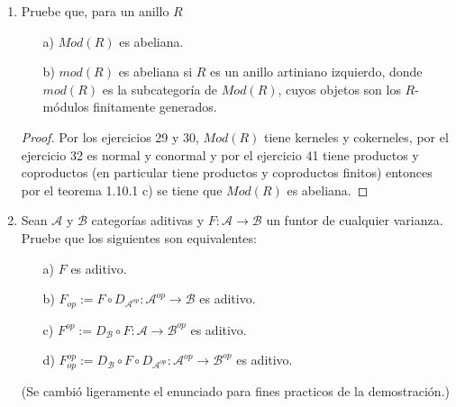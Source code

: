 \documentclass{article}
\begin{document}
\begin{enumerate}[label=\textbf{Ej \arabic*.}]
\begin{proof}
			 Sean $\lrbrack{\pi_1,\pi_2}$ las proyecciones naturales y $\lrbrack{\mu_1,\mu_2}$ las inclusiones naturales del biproducto $A\coprod C$. Entonces $\lambda=\alpha\pi_1+\beta\pi_2\in\ringmodhom{\mathscr{C}}{A\coprod C}{B}$. Supongamos que $f,g\in\ringmodhom{\mathscr{C}}{B}{D}$ son tales que $f\lambda=g\lambda$. Así
			\begin{align*}
				f\lrprth{\alpha\pi_1+\beta\pi_2}&=g\lrprth{\alpha\pi_1+\beta\pi_2},\\
				\implies f\lrprth{\alpha\pi_1+\beta\pi_2}\mu_1&=f\lrprth{\alpha\pi_1+\beta\pi_2}\mu_1\\
				\implies f\lrprth{\alpha\lrprth{\pi_1\mu_1}+\beta\lrprth{\pi_2\mu_1}}&=g\lrprth{\alpha\lrprth{\pi_1\mu_1}+\beta\lrprth{\pi_2\mu_1}}\\
				\implies f\lrprth{\alpha\lrprth{1_A}+\beta 0}&=g\lrprth{\alpha 1_A+\beta 0}\\
				\implies f\alpha=g\alpha.
			\end{align*}
			De lo anterior se sigue que $f=g$ si $\alpha$ es epi. La prueba es análoga, componiendo por $\mu_2$ a derecha, si suponemos que $\beta$ es epi.\\
		\end{proof}
		\item Pruebe que, para un anillo $R$
		\begin{itemize}
			\item[a)] $Mod(R)$ es abeliana.
			\item[b)] $mod(R)$ es abeliana si $R$ es un anillo artiniano izquierdo, donde $mod(R)$ es la subcategoría de $Mod(R)$, cuyos objetos son los $R$-módulos
			finitamente generados.
		\end{itemize}
		\begin{proof}
			 Por los ejercicios 29 y 30, $Mod(R)$ tiene kerneles y cokerneles, por el ejercicio 32 es normal y conormal y por el ejercicio 41 
			tiene productos y coproductos (en particular tiene productos y coproductos finitos) entonces por el teorema 1.10.1 c) se tiene que $Mod(R)$ es abeliana.	
		\end{proof}		
		\item Sean $\mathscr{A}$ y $\mathscr{B}$ categorías aditivas y $F:\mathscr{A}\to \mathscr{B}$ un funtor de cualquier varianza. Pruebe que los 
		siguientes son equivalentes:
		\begin{itemize}
			\item[a)] $F$ es aditivo.
			\item[b)] $F_{op}:=F\circ D_{\mathscr{A}^{op}}: \mathscr{A}^{op}\longrightarrow \mathscr{B}$ es aditivo.
			\item[c)] $F^{op}:=D_{\mathscr{B}}\circ F: \mathscr{A}\longrightarrow \mathscr{B}^{op}$ es aditivo.
			\item[d)] $F_{op}^{op}:=D_{\mathscr{B}}\circ F \circ D_{\mathscr{A}^{op}}: \mathscr{A}^{op}\longrightarrow  \mathscr{B}^{op}$ es aditivo.
		\end{itemize}
		(Se cambió ligeramente el enunciado para fines practicos de la demostración.)
		

\end{enumerate}
\end{document}
